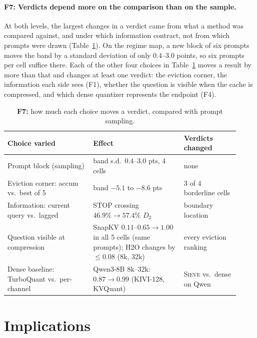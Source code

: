 \documentclass{article}
\newcommand{\sieve}{\textsc{Sieve}}
\theoremstyle{definition}
\begin{document}
\paragraph{F7: Verdicts depend more on the comparison than on the sample.}
At both levels, the largest changes in a verdict came from what a method was compared against, and under which information contract, not from which prompts were drawn (Table~\ref{tab:contract}).  On the regime map, a new block of six prompts moves the band by a standard deviation of only $0.4$--$3.0$ points, so six prompts per cell suffice there.  Each of the other four choices in Table~\ref{tab:contract} moves a result by more than that and changes at least one verdict: the eviction corner, the information each side sees (F1), whether the question is visible when the cache is compressed, and which dense quantizer represents the endpoint (F4).
\begin{table}[t]
\centering
\small
\setlength{\tabcolsep}{4pt}
\caption{\textbf{F7:} how much each choice moves a verdict, compared with prompt sampling.}
\label{tab:contract}
\begin{tabular}{@{}p{0.34\linewidth}p{0.36\linewidth}p{0.22\linewidth}@{}}
\toprule
\textbf{Choice varied} & \textbf{Effect} & \textbf{Verdicts changed} \\
\midrule
Prompt block (sampling) & band s.d.\ $0.4$--$3.0$ pts, 4 cells & none \\
Eviction corner: accum vs.\ best of 5 & band $-5.1$ to $-8.6$ pts & 3 of 4 borderline cells \\
Information: current query vs.\ lagged & STOP crossing $46.9\%\to57.4\%$ $D_2$ & boundary location \\
Question visible at compression & SnapKV $0.11$--$0.65\to1.00$ in all 5 cells (same prompts); H2O changes by $\le0.08$ (8k, 32k) & every eviction ranking \\
Dense baseline: TurboQuant vs.\ per-channel & Qwen3-8B 8k--32k: $0.87\to0.99$ (KIVI-128, KVQuant) & \sieve{} vs.\ dense on Qwen \\
\bottomrule
\end{tabular}
\vspace{-2mm}
\end{table}


\section{Implications}
\label{sec:implications}
\end{document}
